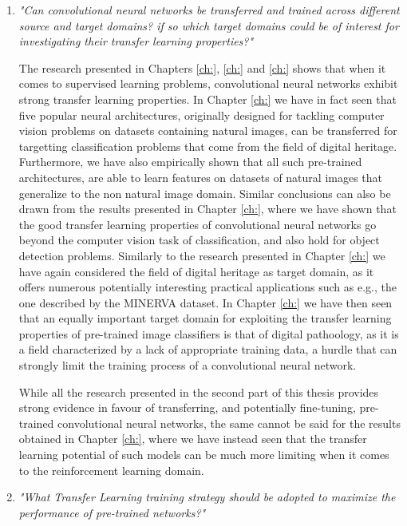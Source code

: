 \begin{enumerate}
	\item \textit{"Can convolutional neural networks be transferred and trained across different source and target domains? if so which target domains could be of interest for investigating their transfer learning properties?"}
	
	The research presented in Chapters \ref{ch:}, \ref{ch:} and \ref{ch:} shows that when it comes to supervised learning problems, convolutional neural networks exhibit strong transfer learning properties. In Chapter \ref{ch:} we have in fact seen that five popular neural architectures, originally designed for tackling computer vision problems on datasets containing natural images, can be transferred for targetting classification problems that come from the field of digital heritage. Furthermore, we have also empirically shown that all such pre-trained architectures, are able to learn features on datasets of natural images that generalize to the non natural image domain. Similar conclusions can also be drawn from the results presented in Chapter \ref{ch:}, where we have shown that the good transfer learning properties of convolutional neural networks go beyond the computer vision task of classification, and also hold for object detection problems. Similarly to the research presented in Chapter \ref{ch:} we have again considered the field of digital heritage as target domain, as it offers numerous potentially interesting practical applications such as e.g., the one described by the MINERVA dataset. In Chapter \ref{ch:} we have then seen that an equally important target domain for exploiting the transfer learning properties of pre-trained image classifiers is that of digital pathoology, as it is a field characterized by a lack of appropriate training data, a hurdle that can strongly limit the training process of a convolutional neural network.

	While all the research presented in the second part of this thesis provides strong evidence in favour of transferring, and potentially fine-tuning, pre-trained convolutional neural networks, the same cannot be said for the results obtained in Chapter \ref{ch:}, where we have instead seen that the transfer learning potential of such models can be much more limiting when it comes to the reinforcement learning domain. 

	
	\item \textit{"What Transfer Learning training strategy should be adopted to maximize the performance of pre-trained networks?"}


\end{enumerate}
